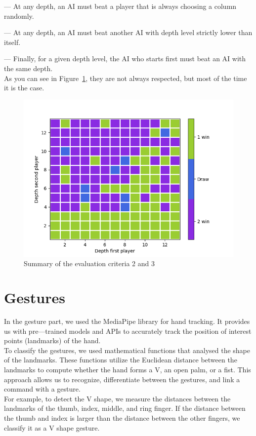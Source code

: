\documentclass[11pt, a4paper, oneside]{report}
\begin{document}
	— At any depth, an AI must beat a player that is always choosing a column randomly.

	— At any depth, an AI must beat another AI with depth level strictly lower than itself.

	— Finally, for a given depth level, the AI who starts first must beat an AI with the same depth. \\

	As you can see in Figure~\ref{fig:summary_criteria}, they are not always respected, but most of the time it is the case.
	\begin{figure}[ht]
		\includegraphics[scale=0.7]{result_criteria.png}
		\centering
		\caption{Summary of the evaluation criteria 2 and 3}\label{fig:summary_criteria}
	\end{figure}

	\section{Gestures}
	In the gesture part, we used the MediaPipe library for hand tracking. It provides us with pre—trained models and APIs to accurately track the position of interest points (landmarks) of the hand. \\

	To classify the gestures, we used mathematical functions that analysed the shape of the landmarks. These functions utilize the Euclidean distance between the landmarks to compute whether the hand forms a V, an open palm, or a fist. This approach allows us to recognize, differentiate between the gestures, and link a command with a gesture. \\
	For example, to detect the V shape, we measure the distances between the landmarks of the thumb, index, middle, and ring finger. If the distance between the thumb and index is larger than the distance between the other fingers, we classify it as a V shape gesture. \\
\end{document}
